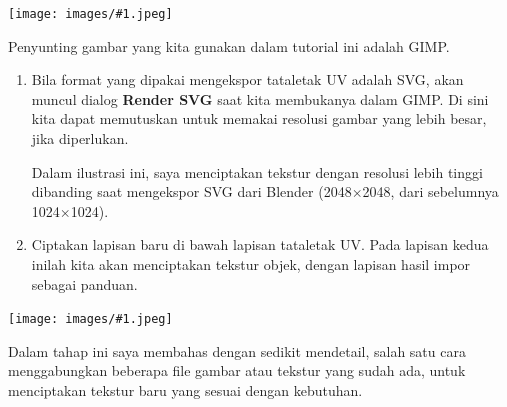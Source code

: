 \documentclass[11pt]{report}
\newcommand{\fig}[1]{
  \begingroup
  \centering
  \texttt{[image: images/\#1.jpeg]}
  \label{fig:#1}
  \endgroup
}
\begin{document}
\fig{gimp-001}

Penyunting gambar yang kita gunakan dalam tutorial ini adalah GIMP.

\begin{enumerate}
\item Bila format yang dipakai mengekspor tataletak UV adalah SVG, akan muncul dialog \textbf{Render SVG} saat kita membukanya dalam GIMP. Di sini kita dapat memutuskan untuk memakai resolusi gambar yang lebih besar, jika diperlukan.

  Dalam ilustrasi ini, saya menciptakan tekstur dengan resolusi lebih tinggi dibanding saat mengekspor SVG dari Blender (2048$\times$2048, dari sebelumnya 1024$\times$1024).
\item Ciptakan lapisan baru di bawah lapisan tataletak UV. Pada lapisan kedua inilah kita akan menciptakan tekstur objek, dengan lapisan hasil impor sebagai panduan.
\end{enumerate}

\fig{gimp-002}

Dalam tahap ini saya membahas dengan sedikit mendetail, salah satu cara menggabungkan beberapa file gambar atau tekstur yang sudah ada, untuk menciptakan tekstur baru yang sesuai dengan kebutuhan.
\end{document}
